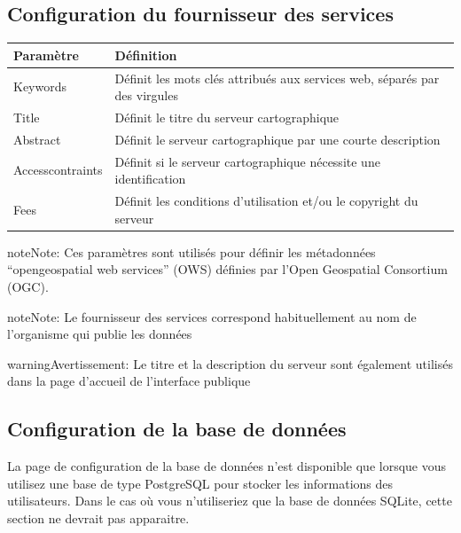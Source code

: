 \documentclass[letterpaper,10pt,french]{sphinxmanual}
\begin{document}
\subsection{Configuration du fournisseur des services}
\label{dashboard/configuration:configuration-du-fournisseur-des-services}
\begin{tabulary}{\linewidth}{|L|L|}
\hline

\textbf{Paramètre}
 & 
\textbf{Définition}
\\
\hline
Keywords
 & 
Définit les mots clés attribués aux services web, séparés par des virgules
\\
\hline
Title
 & 
Définit le titre du serveur cartographique
\\
\hline
Abstract
 & 
Définit le serveur cartographique par une courte description
\\
\hline
Accesscontraints
 & 
Définit si le serveur cartographique nécessite une identification
\\
\hline
Fees
 & 
Définit les conditions d'utilisation et/ou le copyright du serveur
\\
\hline\end{tabulary}


\begin{notice}{note}{Note:}
Ces paramètres sont utilisés pour définir les métadonnées ``opengeospatial web services'' (OWS) définies par l'Open Geospatial Consortium  (OGC).
\end{notice}

\begin{notice}{note}{Note:}
Le fournisseur des services correspond habituellement au nom de l'organisme qui publie les données
\end{notice}

\begin{notice}{warning}{Avertissement:}
Le titre et la description du serveur sont également utilisés dans la page d'accueil de l'interface publique
\end{notice}


\subsection{Configuration de la base de données}
\label{dashboard/configuration:configuration-de-la-base-de-donnees}
La page de configuration de la base de données n'est disponible que
lorsque vous utilisez une base de type PostgreSQL pour stocker les
informations des utilisateurs. Dans le cas où vous n'utiliseriez que
la base de données SQLite, cette section ne devrait pas apparaitre.
\end{document}
